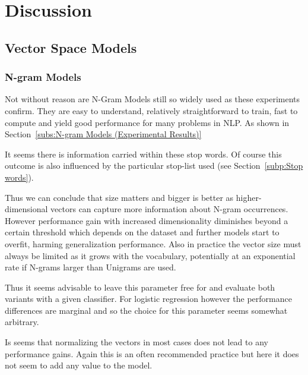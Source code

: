 
\clearpage

\section{Discussion}
\label{sec:Discussion}


\subsection{Vector Space Models}
\label{sub:Vector Space Models (Discussion)}

\subsubsection{N-gram Models}

Not without reason are N-Gram Models still so widely used as these experiments confirm. They are easy to understand, relatively straightforward to train, fast to compute and yield good performance for many problems in \gls{NLP}. As shown in Section~\ref{subs:N-gram Models (Experimental Results)}

It seems there is information carried within these stop words. Of course this outcome is also influenced by the particular stop-list used (see Section~\ref{subp:Stop words}).

Thus we can conclude that size matters and bigger is better as higher-dimensional vectors can capture more information about N-gram occurrences. However performance gain with increased dimensionality diminishes beyond a certain threshold which depends on the dataset and further models start to overfit, harming generalization performance.
Also in practice the vector size must always be limited as it grows with the vocabulary, potentially at an exponential rate if N-grams larger than Unigrams are used.

 Thus it seems advisable to leave this parameter free for and evaluate both variants with a given classifier. For logistic regression however the performance differences are marginal and so the choice for this parameter seems somewhat arbitrary.


 Is seems that normalizing the vectors in most cases does not lead to any performance gains. Again this is an often recommended practice but here it does not seem to add any value to the model.


